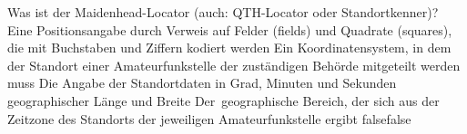     {Was ist der Maidenhead-Locator (auch: QTH-Locator oder Standortkenner)?}
    {Eine Positionsangabe durch Verweis auf Felder (fields) und Quadrate (squares), die mit Buchstaben und Ziffern kodiert werden}
    {Ein Koordinatensystem, in dem der Standort einer Amateurfunkstelle der zuständigen Behörde mitgeteilt werden muss}
    {Die Angabe der Standortdaten in Grad, Minuten und Sekunden geographischer Länge und Breite}
    {Der geographische Bereich, der sich aus der Zeitzone des Standorts der jeweiligen Amateurfunkstelle ergibt}
    {false}{false}